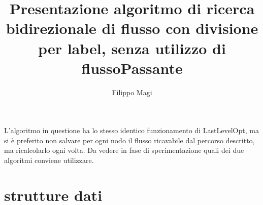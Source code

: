 \documentclass{article}
\title{Presentazione algoritmo di ricerca bidirezionale di flusso con divisione per label, senza utilizzo di flussoPassante}
\author{Filippo Magi }
\begin{document}
\maketitle

L'algoritmo in questione ha lo stesso identico funzionamento di LastLevelOpt, ma si è preferito non salvare per ogni nodo il flusso ricavabile dal percorso
descritto, ma ricalcolarlo ogni volta.
Da vedere in fase di sperimentazione quali dei due algoritmi conviene utilizzare.

\section{strutture dati}
\end{document}
